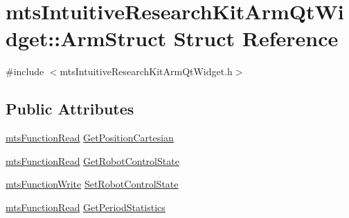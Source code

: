 \hypertarget{structmts_intuitive_research_kit_arm_qt_widget_1_1_arm_struct}{\section{mts\-Intuitive\-Research\-Kit\-Arm\-Qt\-Widget\-:\-:Arm\-Struct Struct Reference}
\label{structmts_intuitive_research_kit_arm_qt_widget_1_1_arm_struct}
}


{\ttfamily \#include $<$mts\-Intuitive\-Research\-Kit\-Arm\-Qt\-Widget.\-h$>$}

\subsection*{Public Attributes}
\begin{DoxyCompactItemize}
\item 
\hyperlink{classmts_function_read}{mts\-Function\-Read} \hyperlink{structmts_intuitive_research_kit_arm_qt_widget_1_1_arm_struct_a782dd4ed23181a9d1d3759ea340e2682}{Get\-Position\-Cartesian}
\item 
\hyperlink{classmts_function_read}{mts\-Function\-Read} \hyperlink{structmts_intuitive_research_kit_arm_qt_widget_1_1_arm_struct_a486a46581e79c411c4bfbe7e1b210314}{Get\-Robot\-Control\-State}
\item 
\hyperlink{classmts_function_write}{mts\-Function\-Write} \hyperlink{structmts_intuitive_research_kit_arm_qt_widget_1_1_arm_struct_a91a2147d07e6b4e2c578bac2a0250696}{Set\-Robot\-Control\-State}
\item 
\hyperlink{classmts_function_read}{mts\-Function\-Read} \hyperlink{structmts_intuitive_research_kit_arm_qt_widget_1_1_arm_struct_a75d48455f6739838ddfe1ea9c1c07ccc}{Get\-Period\-Statistics}
\end{DoxyCompactItemize}


